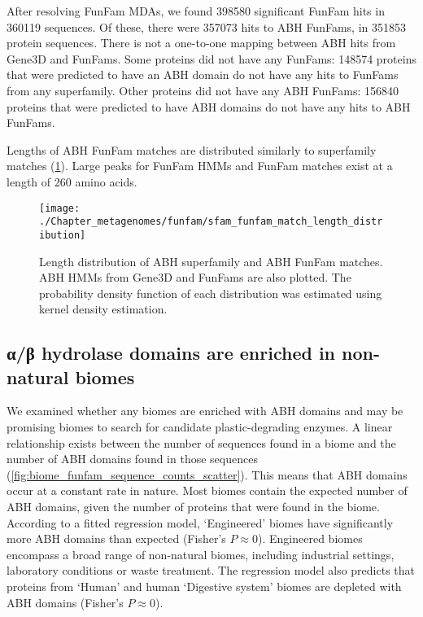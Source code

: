 After resolving FunFam MDAs, we found \num{398580} significant FunFam hits in \num{360119} sequences. Of these, there were \num{357073} hits to ABH FunFams, in \num{351853} protein sequences. There is not a one-to-one mapping between ABH hits from Gene$3$D and FunFams. Some proteins did not have any FunFams: \num{148574} proteins that were predicted to have an ABH domain do not have any hits to FunFams from any superfamily. Other proteins did not have any ABH FunFams: \num{156840} proteins that were predicted to have ABH domains do not have any hits to ABH FunFams.

Lengths of ABH FunFam matches are distributed similarly to superfamily matches (\ref{fig:sfam-funfam-match-length-distribution}). Large peaks for FunFam HMMs and FunFam matches exist at a length of 260 amino acids.

\begin{figure}[!hbt]
    \centering
    \texttt{[image: ./Chapter\_metagenomes/funfam/sfam\_funfam\_match\_length\_distribution]}
    \caption{%
        Length distribution of ABH superfamily and ABH FunFam matches.
        ABH HMMs from Gene$3$D and FunFams are also plotted.
        The probability density function of each distribution was estimated using kernel density estimation.
    }
    \label{fig:sfam-funfam-match-length-distribution}
\end{figure}

\subsection{α/β hydrolase domains are enriched in non-natural biomes}

We examined whether any biomes are enriched with ABH domains and may be promising biomes to search for candidate plastic-degrading enzymes. A linear relationship exists between the number of sequences found in a biome and the number of ABH domains found in those sequences (\ref{fig:biome_funfam_sequence_counts_scatter}). This means that ABH domains occur at a constant rate in nature. Most biomes contain the expected number of ABH domains, given the number of proteins that were found in the biome. According to a fitted regression model, `Engineered' biomes have significantly more ABH domains than expected (Fisher's $P \approx 0$). Engineered biomes encompass a broad range of non-natural biomes, including industrial settings, laboratory conditions or waste treatment. The regression model also predicts that proteins from `Human' and human `Digestive system' biomes are depleted with ABH domains (Fisher's $P \approx 0$).

